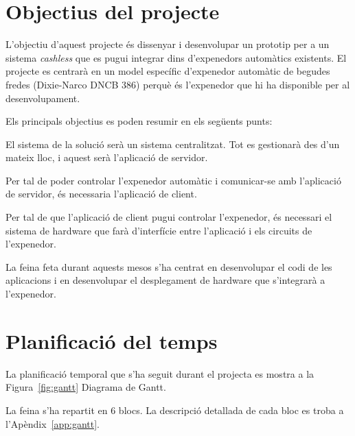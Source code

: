 \section{Objectius del projecte}

L'objectiu d'aquest projecte és dissenyar i desenvolupar un prototip per a un sistema \textit{cashless} que es pugui integrar dins d'expenedors automàtics existents. El projecte es centrarà en un model específic d'expenedor automàtic de begudes fredes (Dixie-Narco DNCB 386) perquè és l'expenedor que hi ha disponible per al desenvolupament.

Els principals objectius es poden resumir en els següents punts:

\vspace{-0.5em}
\begin{description}[font=\normalfont\textsl]
\item [Dissenyar i desenvolupar l'aplicació de servidor. ] El sistema de la solució serà un sistema centralitzat. Tot es gestionarà des d'un mateix lloc, i aquest serà l'aplicació de servidor.
\item [Dissenyar i desenvolupar l'aplicació de client. ] Per tal de poder controlar l'expenedor automàtic i comunicar-se amb l'aplicació de servidor, és necessaria l'aplicació de client.
\item [Dissenyar  Desenvolupar el sistema de hardware. ] Per tal de que l'aplicació de client pugui controlar l'expenedor, és necessari el sistema de hardware que farà d'interfície entre l'aplicació i els circuits de l'expenedor.
\end{description}

La feina feta durant aquests mesos s'ha centrat en desenvolupar el codi de les aplicacions i en desenvolupar el desplegament de hardware que s'integrarà a l'expenedor.

\section{Planificació del temps}

La planificació temporal que s'ha seguit durant el projecta es mostra a la Figura~\ref{fig:gantt} Diagrama de Gantt.

La feina s'ha repartit en 6 blocs. La descripció detallada de cada bloc es troba a l'Apèndix~\ref{app:gantt}.

